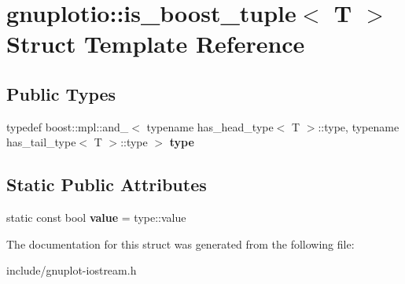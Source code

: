\hypertarget{structgnuplotio_1_1is__boost__tuple}{}\section{gnuplotio\+:\+:is\+\_\+boost\+\_\+tuple$<$ T $>$ Struct Template Reference}
\label{structgnuplotio_1_1is__boost__tuple}
\subsection*{Public Types}
\begin{DoxyCompactItemize}
\item 
\mbox{\label{structgnuplotio_1_1is__boost__tuple_ad771f62833b23ecae5dc689e6248396a}} 
typedef boost\+::mpl\+::and\+\_\+$<$ typename has\+\_\+head\+\_\+type$<$ T $>$\+::type, typename has\+\_\+tail\+\_\+type$<$ T $>$\+::type $>$ {\bfseries type}
\end{DoxyCompactItemize}
\subsection*{Static Public Attributes}
\begin{DoxyCompactItemize}
\item 
\mbox{\label{structgnuplotio_1_1is__boost__tuple_ae6664b02421d28585204104af65a4744}} 
static const bool {\bfseries value} = type\+::value
\end{DoxyCompactItemize}


The documentation for this struct was generated from the following file\+:\begin{DoxyCompactItemize}
\item 
include/gnuplot-\/iostream.\+h\end{DoxyCompactItemize}
